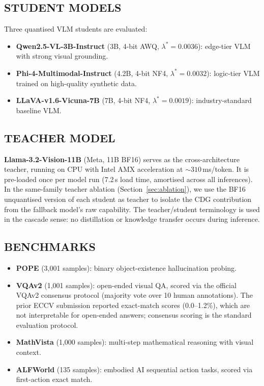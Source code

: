 \documentclass{ieeetmlcn}
\begin{document}
\subsection{STUDENT MODELS}
Three quantised VLM students are evaluated:
\begin{itemize}
  \item \textbf{Qwen2.5-VL-3B-Instruct} \cite{bai2025qwen25vl} (3B,
        4-bit AWQ, $\lambda^*=0.0036$): edge-tier VLM with strong visual
        grounding.
  \item \textbf{Phi-4-Multimodal-Instruct} \cite{abouelenin2025phi4} (4.2B,
        4-bit NF4, $\lambda^*=0.0032$): logic-tier VLM trained on
        high-quality synthetic data.
  \item \textbf{LLaVA-v1.6-Vicuna-7B} \cite{liu2024llavanext} (7B, 4-bit NF4,
        $\lambda^*=0.0019$): industry-standard baseline VLM.
\end{itemize}

\subsection{TEACHER MODEL}
\textbf{Llama-3.2-Vision-11B} \cite{grattafiori2024llama} (Meta, 11B BF16) serves as the cross-architecture teacher, running on CPU with Intel AMX acceleration at $\sim\!310$\,ms/token. It is pre-loaded once per model run (7.2\,s load time, amortised across all inferences). In the same-family teacher ablation (Section~\ref{sec:ablation}), we use the BF16 unquantised version of each student as teacher to isolate the CDG contribution from the fallback model's raw capability. The teacher/student terminology is used in the cascade sense: no distillation or knowledge transfer occurs during inference.

\subsection{BENCHMARKS}
\begin{itemize}
  \item \textbf{POPE} \cite{li2023pope} (3,001 samples): binary
        object-existence hallucination probing.
  \item \textbf{VQAv2} \cite{balanced_vqa_v2} (1,001 samples): open-ended
        visual QA, scored via the official VQAv2 consensus protocol
        (majority vote over 10 human annotations). The prior ECCV
        submission reported exact-match scores (0.0--1.2\%), which are
        not interpretable for open-ended answers; consensus scoring is
        the standard evaluation protocol.
  \item \textbf{MathVista} \cite{lu2024mathvista} (1,000 samples):
        multi-step mathematical reasoning with visual context.
  \item \textbf{ALFWorld} \cite{shridhar2020alfworld} (135 samples):
        embodied AI sequential action tasks, scored via first-action
        exact match.
\end{itemize}
\end{document}
